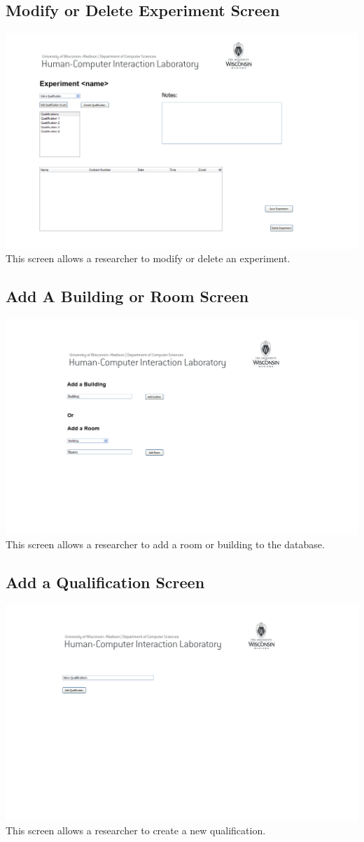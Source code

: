 \subsection{Modify or Delete Experiment Screen}
\includegraphics[width=6in]{../other/User_Interface/Milestone_3/researcher_modifiy_delete_experiment.png}\\
This screen allows a researcher to modify or delete an experiment.

\subsection{Add A Building or Room Screen}
\includegraphics[width=6in]{../other/User_Interface/Milestone_3/researcher_add_building_room.png}\\
This screen allows a researcher to add a room or building to the database.

\subsection{Add a Qualification Screen}
\includegraphics[width=6in]{../other/User_Interface/Milestone_3/researcher_create_qualification.png}\\
This screen allows a researcher to create a new qualification.